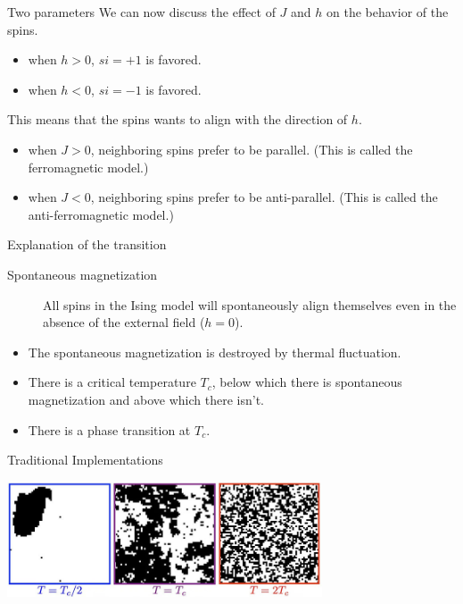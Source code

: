 \begin{frame}{Two parameters}
	We can now discuss the effect of $J$ and $h$ on the behavior of the spins.
	\begin{itemize}
		\item when $h > 0$, $si = +1$ is favored.
		\item when $h < 0$, $si = -1$ is favored.
	\end{itemize}
	This means that the spins wants to align with the direction of $h$.
	\begin{itemize}
		\item when $J > 0$, neighboring spins prefer to be parallel. (This is called the ferromagnetic model.)
		\item when $J < 0$, neighboring spins prefer to be anti-parallel. (This is called the anti-ferromagnetic model.)
	\end{itemize}
	
\end{frame}

\begin{frame}{Explanation of the transition}
	\cite[pp.~74--75]{At low enough temperature:}
	\begin{description}
		\item[Spontaneous magnetization] All spins in the Ising model will spontaneously align themselves even in the absence of the external field ($h = 0$).
	\end{description}
	
	\cite[pp.~74--75]{At high enough temperature:}
	\begin{itemize}
		\item The spontaneous magnetization is destroyed by thermal fluctuation.
		\item There is a critical temperature $T_c$, below which there is spontaneous magnetization and above which there isn’t.
		\item There is a phase transition at $T_c$.
	\end{itemize}
	
\end{frame}

\begin{frame}{Traditional Implementations}
	\begin{table}[ht]
		\centering
		
	\end{table}
	\centerline{\includegraphics[width = 0.7\textwidth]{Figures/im.jpg}}
\end{frame}
